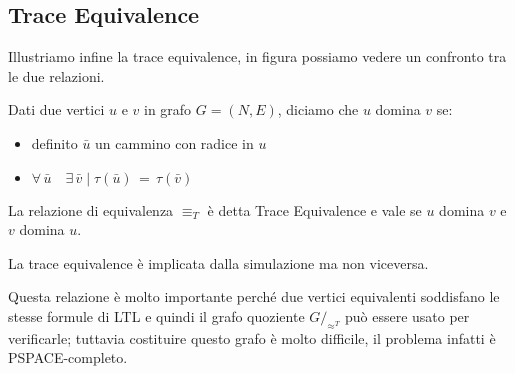 \subsection{Trace Equivalence}
Illustriamo infine la trace equivalence, in figura possiamo vedere un confronto tra le due relazioni.
\begin{definition}
Dati due vertici $u$ e $v$ in grafo $G = (N,E)$, diciamo che $u$ domina $v$ se:
\begin{itemize}
\item definito $\bar{u}$ un cammino con radice in $u$
\item $\forall\,\bar{u}\quad\exists\,\bar{v}\;|\;\tau(\bar{u}) \,=\, \tau(\bar{v})$
\end{itemize}
La relazione di equivalenza $\equiv_T$ è detta Trace Equivalence e vale se $u$ domina $v$ e $v$ domina $u$.
\end{definition}
\begin{lemma}
La trace equivalence è implicata dalla simulazione ma non viceversa.
\end{lemma}
Questa relazione è molto importante perché due vertici equivalenti soddisfano le stesse formule di LTL e quindi il grafo quoziente $G/_{\approx^T}$ può essere usato per verificarle; tuttavia costituire questo grafo è molto difficile, il problema infatti è PSPACE-completo.
\\\\
